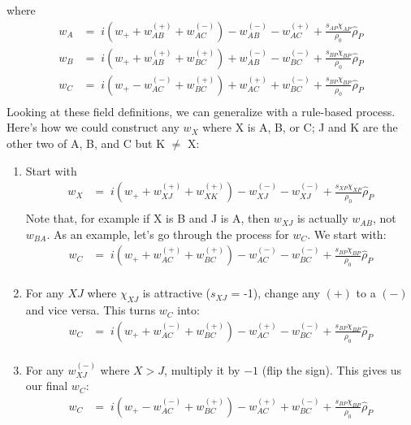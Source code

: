 \documentclass{article}
\begin{document}
where
\begin{align*}
  w_A &=\;
    i \left( w_+ + w_{AB}^{(+)} + w_{AC}^{(-)} \right)
    - w_{AB}^{(-)} - w_{AC}^{(+)}
    + \frac{s_{AP}\chi_{AP}}{\rho_0} \hat{\rho}_P \\
  w_B &=\;
    i \left( w_+ + w_{AB}^{(+)} + w_{BC}^{(+)} \right)
    + w_{AB}^{(-)} - w_{BC}^{(-)}
    + \frac{s_{BP}\chi_{BP}}{\rho_0} \hat{\rho}_P \\
  w_C &=\;
    i \left( w_+ - w_{AC}^{(-)} + w_{BC}^{(+)} \right)
    + w_{AC}^{(+)} + w_{BC}^{(-)}
    + \frac{s_{BP}\chi_{BP}}{\rho_0} \hat{\rho}_P \\
\end{align*}
Looking at these field definitions, we can generalize with a rule-based process.
Here's how we could construct any $w_X$ where X is A, B, or C; J and K
  are the other two of A, B, and C but K $\ne$ X:

\begin{enumerate}
  \item Start with
  {
    \color{red}
    \begin{align*}
      w_X &=\;
        i \left( w_+ + w_{XJ}^{(+)} + w_{XK}^{(+)} \right)
        - w_{XJ}^{(-)} - w_{XJ}^{(-)}
        + \frac{s_{XP}\chi_{XP}}{\rho_0} \hat{\rho}_P \\
    \end{align*}
  }
  Note that, for example if X is B and J is A, then $w_{XJ}$ is actually $w_{AB}$,
    not $w_{BA}$.
  As an example, let's go through the process for $w_C$.
  We start with:
  {
    \color{red}
    \begin{align*}
      w_C &=\;
        i \left( w_+ + w_{AC}^{(+)} + w_{BC}^{(+)} \right)
        - w_{AC}^{(-)} - w_{BC}^{(-)}
        + \frac{s_{BP}\chi_{BP}}{\rho_0} \hat{\rho}_P \\
    \end{align*}
  }

  \item For any $XJ$ where $\chi_{XJ}$ is attractive ($s_{XJ}$ = -1), change any
    $(+)$ to a $(-)$ and vice versa.
  This turns $w_C$ into:
  {
    \color{red}
    \begin{align*}
      w_C &=\;
        i \left( w_+ + w_{AC}^{(-)} + w_{BC}^{(+)} \right)
        - w_{AC}^{(+)} - w_{BC}^{(-)}
        + \frac{s_{BP}\chi_{BP}}{\rho_0} \hat{\rho}_P \\
    \end{align*}
  }

  \item For any $w_{XJ}^{(-)}$ where $X > J$, multiply it by $-1$ (flip the sign).
  This gives us our final $w_C$:
  {
    \color{green}
    \begin{align*}
      w_C &=\;
        i \left( w_+ - w_{AC}^{(-)} + w_{BC}^{(+)} \right)
        - w_{AC}^{(+)} + w_{BC}^{(-)}
        + \frac{s_{BP}\chi_{BP}}{\rho_0} \hat{\rho}_P \\
    \end{align*}
  }
\end{enumerate}
\end{document}
